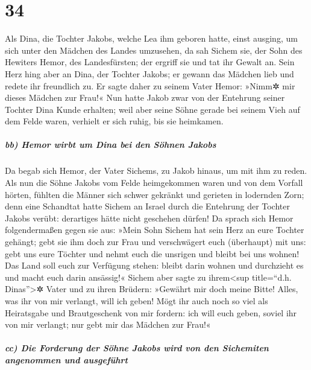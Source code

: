 \hypertarget{section-33}{%
\section{34}\label{section-33}}

 Als Dina, die Tochter Jakobs, welche Lea ihm geboren
hatte, einst ausging, um sich unter den Mädchen des Landes umzusehen,
 da sah Sichem sie, der Sohn des Hewiters Hemor, des
Landesfürsten; der ergriff sie und tat ihr Gewalt an. 
Sein Herz hing aber an Dina, der Tochter Jakobs; er gewann das Mädchen
lieb und redete ihr freundlich zu.  Er sagte daher zu
seinem Vater Hemor: »Nimm✲ mir dieses Mädchen zur Frau!« 
Nun hatte Jakob zwar von der Entehrung seiner Tochter Dina Kunde
erhalten; weil aber seine Söhne gerade bei seinem Vieh auf dem Felde
waren, verhielt er sich ruhig, bis sie heimkamen.

\hypertarget{bb-hemor-wirbt-um-dina-bei-den-suxf6hnen-jakobs}{%
\subparagraph{bb) Hemor wirbt um Dina bei den Söhnen
Jakobs}\label{bb-hemor-wirbt-um-dina-bei-den-suxf6hnen-jakobs}}

 Da begab sich Hemor, der Vater Sichems, zu Jakob hinaus,
um mit ihm zu reden.  Als nun die Söhne Jakobs vom Felde
heimgekommen waren und von dem Vorfall hörten, fühlten die Männer sich
schwer gekränkt und gerieten in lodernden Zorn; denn eine Schandtat
hatte Sichem an Israel durch die Entehrung der Tochter Jakobs verübt:
derartiges hätte nicht geschehen dürfen!  Da sprach sich
Hemor folgendermaßen gegen sie aus: »Mein Sohn Sichem hat sein Herz an
eure Tochter gehängt; gebt sie ihm doch zur Frau  und
verschwägert euch (überhaupt) mit uns: gebt uns eure Töchter und nehmt
euch die unsrigen  und bleibt bei uns wohnen! Das Land
soll euch zur Verfügung stehen: bleibt darin wohnen und durchzieht es
und macht euch darin ansässig!«  Sichem aber sagte zu
ihrem\textless sup title=``d.h. Dinas''\textgreater✲ Vater und zu ihren
Brüdern: »Gewährt mir doch meine Bitte! Alles, was ihr von mir verlangt,
will ich geben!  Mögt ihr auch noch so viel als
Heiratsgabe und Brautgeschenk von mir fordern: ich will euch geben,
soviel ihr von mir verlangt; nur gebt mir das Mädchen zur Frau!«

\hypertarget{cc-die-forderung-der-suxf6hne-jakobs-wird-von-den-sichemiten-angenommen-und-ausgefuxfchrt}{%
\subparagraph{cc) Die Forderung der Söhne Jakobs wird von den Sichemiten
angenommen und
ausgeführt}\label{cc-die-forderung-der-suxf6hne-jakobs-wird-von-den-sichemiten-angenommen-und-ausgefuxfchrt}}

